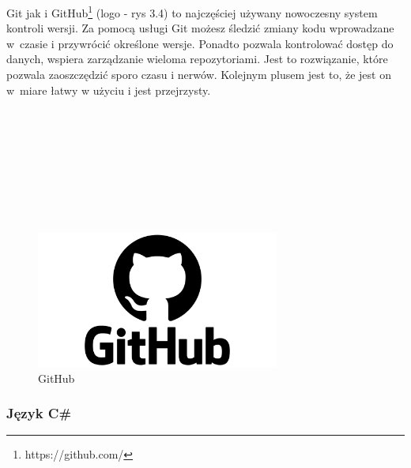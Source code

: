 Git jak i GitHub\footnote{ https://github.com/\cite{www4}}  (logo - rys 3.4) to najczęściej używany nowoczesny system kontroli wersji. Za pomocą usługi Git możesz śledzić zmiany kodu wprowadzane w~czasie i przywrócić określone wersje. Ponadto pozwala kontrolować dostęp do danych, wspiera zarządzanie wieloma repozytoriami. Jest to rozwiązanie, które pozwala zaoszczędzić sporo czasu i nerwów. Kolejnym plusem jest to, że jest on w~miare łatwy w użyciu i jest przejrzysty. 
\\
\\
\\
\\
\\
\\
\\
\\
\\
	\begin{figure}[!htb]
	\begin{center}
		\includegraphics[width=8cm]{rys/git.png}
		\caption{GitHub}
		\label{rys:rysunek001}
	\end{center}
\end{figure}


\subsubsection{Język C\#}

